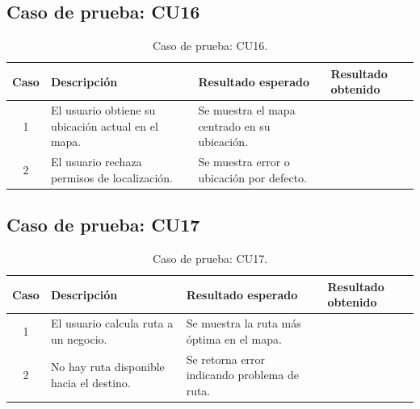 
\subsection{Caso de prueba: CU16}

\begin{table}[H]
\centering
\label{tab:cu16_white_test}
\renewcommand{\arraystretch}{1.3}
\begin{tabular}{|c|p{5cm}|p{6cm}|p{2.5cm}|}
\hline
\rowcolor[RGB]{217,217,217}
\textbf{Caso} & \textbf{Descripción} & \textbf{Resultado esperado} & \textbf{Resultado obtenido} \\
\hline

1 &
El usuario obtiene su ubicación actual en el mapa. &
Se muestra el mapa centrado en su ubicación. &
 \\
\hline

2 &
El usuario rechaza permisos de localización. &
Se muestra error o ubicación por defecto. &
 \\
\hline

\end{tabular}
\caption{Caso de prueba: CU16.}
\end{table}


\subsection{Caso de prueba: CU17}

\begin{table}[H]
\centering
\label{tab:cu17_white_test}
\renewcommand{\arraystretch}{1.3}
\begin{tabular}{|c|p{5cm}|p{6cm}|p{2.5cm}|}
\hline
\rowcolor[RGB]{217,217,217}
\textbf{Caso} & \textbf{Descripción} & \textbf{Resultado esperado} & \textbf{Resultado obtenido} \\
\hline

1 &
El usuario calcula ruta a un negocio. &
Se muestra la ruta más óptima en el mapa. &
 \\
\hline

2 &
No hay ruta disponible hacia el destino. &
Se retorna error indicando problema de ruta. &
 \\
\hline

\end{tabular}
\caption{Caso de prueba: CU17.}
\end{table}

